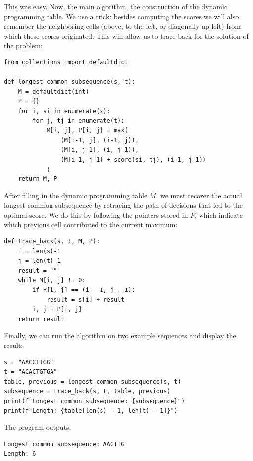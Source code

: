 This was easy. Now, the main algorithm, the construction of the dynamic programming table. We use a trick: besides computing the scores we will also remember the neighboring cells (above, to the left, or diagonally up-left) from which these scores originated. This will allow us to trace back for the solution of the problem:

\vspace*{3mm}
\begin{lstlisting}
from collections import defaultdict

def longest_common_subsequence(s, t):
    M = defaultdict(int)
    P = {}
    for i, si in enumerate(s):
        for j, tj in enumerate(t):
            M[i, j], P[i, j] = max(
                (M[i-1, j], (i-1, j)),
                (M[i, j-1], (i, j-1)),
                (M[i-1, j-1] + score(si, tj), (i-1, j-1))
            )
    return M, P
\end{lstlisting}

After filling in the dynamic programming table $M$, we must recover the actual longest common subsequence by retracing the path of decisions that led to the optimal score. We do this by following the pointers stored in $P$, which indicate which previous cell contributed to the current maximum:

\vspace*{3mm}
\begin{lstlisting}
def trace_back(s, t, M, P):
    i = len(s)-1
    j = len(t)-1
    result = ""
    while M[i, j] != 0:
        if P[i, j] == (i - 1, j - 1):
            result = s[i] + result
        i, j = P[i, j]
    return result
\end{lstlisting}

Finally, we can run the algorithm on two example sequences and display the result:

\vspace*{3mm}
\begin{lstlisting}
s = "AACCTTGG"
t = "ACACTGTGA"
table, previous = longest_common_subsequence(s, t)
subsequence = trace_back(s, t, table, previous)
print(f"Longest common subsequence: {subsequence}")
print(f"Length: {table[len(s) - 1, len(t) - 1]}")

\end{lstlisting}

The program outputs:

\vspace*{3mm}
\begin{lstlisting}
Longest common subsequence: AACTTG
Length: 6
\end{lstlisting}

